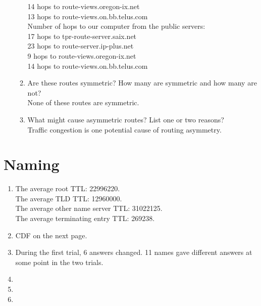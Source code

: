 \documentclass{article}
\begin{document}
\begin{enumerate}
\begin{enumerate}
    14 hops to route-views.oregon-ix.net\\
    13 hops to route-views.on.bb.telus.com\\
    Number of hops to our computer from the public servers:\\
    17 hops to tpr-route-server.saix.net\\
    23 hops to route-server.ip-plus.net\\
    9 hops to route-views.oregon-ix.net\\
    14 hops to route-views.on.bb.telus.com
    \item Are these routes symmetric? How many are symmetric and how many are not?\\
    None of these routes are symmetric.
    \item What might cause asymmetric routes? List one or two reasons? \\
    Traffic congestion is one potential cause of routing asymmetry.
    \end{enumerate}
\end{enumerate}
\section{Naming}
    \begin{enumerate}
        \item
        The average root TTL: 22996220.\\
        The average TLD TTL: 12960000.\\
        The average other name server TTL: 31022125.\\
        The average terminating entry TTL: 269238.
        \item
        CDF on the next page. 
        

        \item
        During the first trial, 6 answers changed. 11 names gave different answers at some point in the two trials.
        \item

        \item
        \item
    \end{enumerate}
\end{document}
